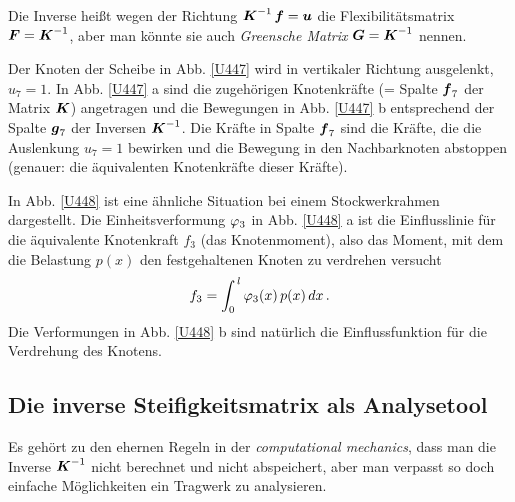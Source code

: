 {Die Inverse hei{\ss}t wegen der Richtung $\mbox{\boldmath $K$}^{-1}\,\mbox{\boldmath $f$} = \mbox{\boldmath $u$}$ die Flexibilit\"{a}tsmatrix $\mbox{\boldmath $F$} = \mbox{\boldmath $K$}^{-1}$, aber man k\"{o}nnte sie auch {\em Greensche Matrix\/} $\mbox{\boldmath $G$}= \mbox{\boldmath $K$}^{-1}$  nennen.

Der Knoten der Scheibe in Abb. \ref{U447} wird in vertikaler Richtung ausgelenkt, $u_7 = 1 $. In Abb. \ref{U447} a sind die zugeh\"{o}rigen Knotenkr\"{a}fte (= Spalte $\mbox{\boldmath $f$}_{7}$ der Matrix $\mbox{\boldmath $K$}$) angetragen und die Bewegungen in Abb.  \ref{U447} b entsprechend der Spalte $\mbox{\boldmath $g$}_{7}$ der Inversen $\mbox{\boldmath $K$}^{-1}$. Die Kr\"{a}fte in Spalte $\mbox{\boldmath $f$}_{7}$ sind die Kr\"{a}fte, die die Auslenkung $u_{7} = 1$ bewirken und die Bewegung in den Nachbarknoten abstoppen (genauer: die \"{a}quivalenten Knotenkr\"{a}fte dieser Kr\"{a}fte).

In Abb. \ref{U448} ist eine \"{a}hnliche Situation bei einem Stockwerkrahmen dargestellt. 
Die Einheitsverformung $\varphi_3$ in Abb. \ref{U448} a ist die Einflusslinie f\"{u}r die \"{a}quivalente Knotenkraft $f_3$ (das Knotenmoment), also das Moment, mit dem die Belastung $p(x)$ den festgehaltenen Knoten zu verdrehen versucht
\begin{align}
f_3 = \int_0^{\,l} \varphi_3(x)\,p(x)\,dx\,.
\end{align}
Die Verformungen in Abb. \ref{U448} b sind nat\"{u}rlich die Einflussfunktion f\"{u}r die Verdrehung des Knotens.

{\textcolor{sectionTitleBlue}{\section{Die inverse Steifigkeitsmatrix als Analysetool}}}
Es geh\"{o}rt zu den ehernen Regeln in der {\em computational mechanics\/}, dass man die Inverse $\mbox{\boldmath $K$}^{-1}$ nicht berechnet und nicht abspeichert, aber man verpasst so doch einfache M\"{o}glichkeiten ein Tragwerk zu analysieren.

}

